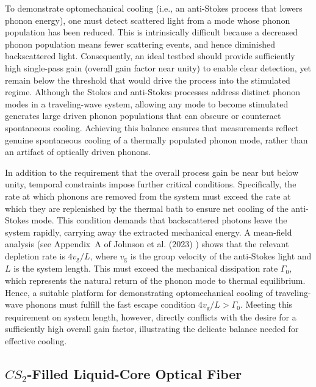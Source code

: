To demonstrate optomechanical cooling (i.e., an anti-Stokes process that lowers phonon energy), one must detect scattered light from a mode whose phonon population has been reduced. This is intrinsically difficult because a decreased phonon population means fewer scattering events, and hence diminished backscattered light. Consequently, an ideal testbed should provide sufficiently high single-pass gain (overall gain factor near unity) to enable clear detection, yet remain below the threshold that would drive the process into the stimulated regime. Although the Stokes and anti-Stokes processes address distinct phonon modes in a traveling-wave system, allowing any mode to become stimulated generates large driven phonon populations that can obscure or counteract spontaneous cooling. Achieving this balance ensures that measurements reflect genuine spontaneous cooling of a thermally populated phonon mode, rather than an artifact of optically driven phonons.

In addition to the requirement that the overall process gain be near but below unity, temporal constraints impose further critical conditions. Specifically, the rate at which phonons are removed from the system must exceed the rate at which they are replenished by the thermal bath to ensure net cooling of the anti-Stokes mode. This condition demands that backscattered photons leave the system rapidly, carrying away the extracted mechanical energy. A mean-field analysis (see Appendix~A of Johnson et al. (2023) \cite{johnson2023laser}) shows that the relevant depletion rate is \(4v_{\mathrm{g}}/L\), where \(v_{\mathrm{g}}\) is the group velocity of the anti-Stokes light and \(L\) is the system length. This must exceed the mechanical dissipation rate \(\Gamma_{\mathrm{0}}\), which represents the natural return of the phonon mode to thermal equilibrium. Hence, a suitable platform for demonstrating optomechanical cooling of traveling-wave phonons must fulfill the fast escape condition \(4v_{\mathrm{g}}/L > \Gamma_{\mathrm{0}}\). Meeting this requirement on system length, however, directly conflicts with the desire for a sufficiently high overall gain factor, illustrating the delicate balance needed for effective cooling.


\subsection{\texorpdfstring{$CS_{2}$}{CS2}-Filled Liquid-Core Optical Fiber}
\label{Cooling:subsec:CS2FilledLCOF}

